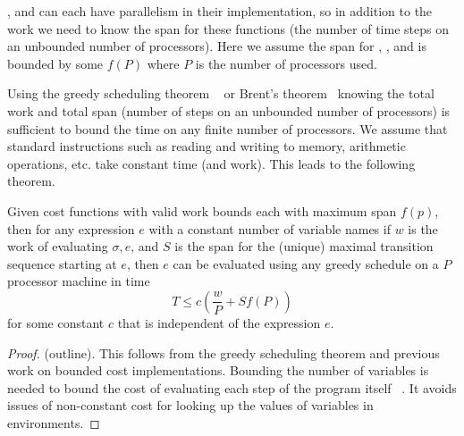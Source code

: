 \new{}, \get{} and \set{} can each have parallelism in their implementation, so in addition to the work we need to know the span for these functions (the number of time steps on an unbounded number of processors). Here we assume the span for \new{}, \get{}, and \set{} is bounded by some $f(P)$ where $P$ is the number of processors used.   

Using the greedy scheduling theorem ~\cite{BlumofeLeiserson} or Brent's
theorem~\cite{brent} knowing the total work and total span (number of
steps on an unbounded number of processors) is sufficient to bound the
time on any finite number of processors. We assume that standard instructions such as reading and writing to memory, arithmetic operations, etc. take constant time (and work). This leads to the following theorem.

\begin{theorem}
\label{thm:brent}
Given cost functions with valid work bounds each with maximum span
$f(p)$, then for any expression $e$ with a constant number of
variable names if $w$ is the work of evaluating $\sigma, e$, and $S$ is the span for the (unique) maximal transition sequence starting at $e$, then $e$ can be evaluated using any greedy schedule on a $P$ processor machine in time
\[ T \leq c \left(\frac{w}{P} + S f(P)\right)\]
for some constant $c$ that is independent of the expression $e$.
\end{theorem}
\begin{proof} (outline).  This follows from the greedy scheduling theorem and previous work on bounded cost implementations. Bounding the number of variables is needed to bound the cost of evaluating each step of the program itself ~\cite{BG95}. It avoids issues of non-constant cost for looking up the values of variables in environments.
\end{proof}
